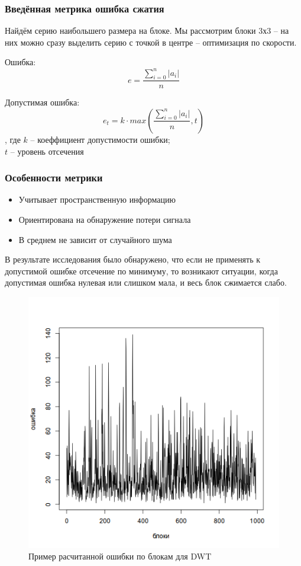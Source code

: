 \documentclass{beamer}
\begin{document}
\begin{frame}
\frametitle{Введённая метрика ошибка сжатия}

Найдём серию наибольшего размера на блоке. Мы рассмотрим блоки 3х3 -- на
них можно сразу выделить серию с точкой в центре -- оптимизация по скорости.

Ошибка:
\[ e = \frac{\sum_{i=0}^n |a_i|}{n} \]

Допустимая ошибка:
\[ e_t = k \cdot max \left( \frac{\sum_{i=0}^n |a_i|}{n}, t \right) \]
, где $k$ -- коеффициент допустимости ошибки; \\
$t$ -- уровень отсечения

\end{frame}

\begin{frame}
\frametitle{Особенности метрики}

\begin{itemize}
\item Учитывает пространственную информацию
\item Ориентирована на обнаружение потери сигнала
\item В среднем не зависит от случайного шума
\end{itemize}
В результате исследования было обнаружено, что если не применять к допустимой
ошибке отсечение по минимуму, то возникают ситуации, когда допустимая ошибка
нулевая или слишком мала, и весь блок сжимается слабо.
\begin{figure}
  \includegraphics[height=0.3\textheight]{img/field/errplot}
  \caption{Пример расчитанной ошибки по блокам для DWT}
\end{figure}

\end{frame}
\end{document}

